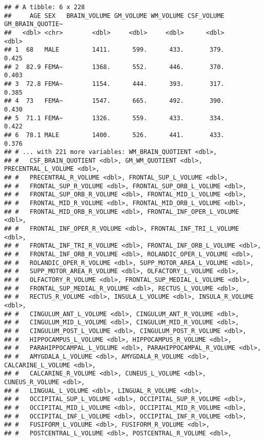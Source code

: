 \documentclass[
]{article}
\begin{document}
\begin{verbatim}
## # A tibble: 6 x 228
##     AGE SEX   BRAIN_VOLUME GM_VOLUME WM_VOLUME CSF_VOLUME GM_BRAIN_QUOTIE~
##   <dbl> <chr>        <dbl>     <dbl>     <dbl>      <dbl>            <dbl>
## 1  68   MALE         1411.      599.      433.       379.            0.425
## 2  82.9 FEMA~        1368.      552.      446.       370.            0.403
## 3  72.8 FEMA~        1154.      444.      393.       317.            0.385
## 4  73   FEMA~        1547.      665.      492.       390.            0.430
## 5  71.1 FEMA~        1326.      559.      433.       334.            0.422
## 6  78.1 MALE         1400.      526.      441.       433.            0.376
## # ... with 221 more variables: WM_BRAIN_QUOTIENT <dbl>,
## #   CSF_BRAIN_QUOTIENT <dbl>, GM_WM_QUOTIENT <dbl>, PRECENTRAL_L_VOLUME <dbl>,
## #   PRECENTRAL_R_VOLUME <dbl>, FRONTAL_SUP_L_VOLUME <dbl>,
## #   FRONTAL_SUP_R_VOLUME <dbl>, FRONTAL_SUP_ORB_L_VOLUME <dbl>,
## #   FRONTAL_SUP_ORB_R_VOLUME <dbl>, FRONTAL_MID_L_VOLUME <dbl>,
## #   FRONTAL_MID_R_VOLUME <dbl>, FRONTAL_MID_ORB_L_VOLUME <dbl>,
## #   FRONTAL_MID_ORB_R_VOLUME <dbl>, FRONTAL_INF_OPER_L_VOLUME <dbl>,
## #   FRONTAL_INF_OPER_R_VOLUME <dbl>, FRONTAL_INF_TRI_L_VOLUME <dbl>,
## #   FRONTAL_INF_TRI_R_VOLUME <dbl>, FRONTAL_INF_ORB_L_VOLUME <dbl>,
## #   FRONTAL_INF_ORB_R_VOLUME <dbl>, ROLANDIC_OPER_L_VOLUME <dbl>,
## #   ROLANDIC_OPER_R_VOLUME <dbl>, SUPP_MOTOR_AREA_L_VOLUME <dbl>,
## #   SUPP_MOTOR_AREA_R_VOLUME <dbl>, OLFACTORY_L_VOLUME <dbl>,
## #   OLFACTORY_R_VOLUME <dbl>, FRONTAL_SUP_MEDIAL_L_VOLUME <dbl>,
## #   FRONTAL_SUP_MEDIAL_R_VOLUME <dbl>, RECTUS_L_VOLUME <dbl>,
## #   RECTUS_R_VOLUME <dbl>, INSULA_L_VOLUME <dbl>, INSULA_R_VOLUME <dbl>,
## #   CINGULUM_ANT_L_VOLUME <dbl>, CINGULUM_ANT_R_VOLUME <dbl>,
## #   CINGULUM_MID_L_VOLUME <dbl>, CINGULUM_MID_R_VOLUME <dbl>,
## #   CINGULUM_POST_L_VOLUME <dbl>, CINGULUM_POST_R_VOLUME <dbl>,
## #   HIPPOCAMPUS_L_VOLUME <dbl>, HIPPOCAMPUS_R_VOLUME <dbl>,
## #   PARAHIPPOCAMPAL_L_VOLUME <dbl>, PARAHIPPOCAMPAL_R_VOLUME <dbl>,
## #   AMYGDALA_L_VOLUME <dbl>, AMYGDALA_R_VOLUME <dbl>, CALCARINE_L_VOLUME <dbl>,
## #   CALCARINE_R_VOLUME <dbl>, CUNEUS_L_VOLUME <dbl>, CUNEUS_R_VOLUME <dbl>,
## #   LINGUAL_L_VOLUME <dbl>, LINGUAL_R_VOLUME <dbl>,
## #   OCCIPITAL_SUP_L_VOLUME <dbl>, OCCIPITAL_SUP_R_VOLUME <dbl>,
## #   OCCIPITAL_MID_L_VOLUME <dbl>, OCCIPITAL_MID_R_VOLUME <dbl>,
## #   OCCIPITAL_INF_L_VOLUME <dbl>, OCCIPITAL_INF_R_VOLUME <dbl>,
## #   FUSIFORM_L_VOLUME <dbl>, FUSIFORM_R_VOLUME <dbl>,
## #   POSTCENTRAL_L_VOLUME <dbl>, POSTCENTRAL_R_VOLUME <dbl>,

\end{verbatim}
\end{document}
